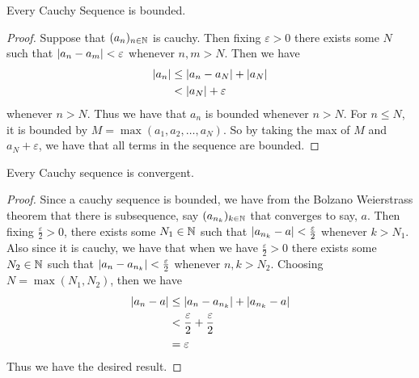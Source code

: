 \documentclass[a4paper]{article}
\begin{document}
\begin{prp}{}{} Every Cauchy Sequence is bounded. \tcbline
\begin{proof} Suppose that $(a_n)_{n\in\mathbb{N}}$ is cauchy. Then fixing $\varepsilon>0$ there exists some $N$ such that $\abs{a_n-a_m}<\varepsilon$ whenever $n,m>N$. Then we have
\begin{align*}
\abs{a_n}&\leq\abs{a_n-a_N}+\abs{a_N}\\
&<\abs{a_N}+\varepsilon
\end{align*}
whenever $n>N$. Thus we have that $a_n$ is bounded whenever $n>N$. For $n\leq N$, it is bounded by $M=\max{(a_1,a_2,\dots,a_N)}$. So by taking the max of $M$ and $a_N+\varepsilon$, we have that all terms in the sequence are bounded. 
\end{proof}
\end{prp}

\begin{prp}{}{} Every Cauchy sequence is convergent. \tcbline
\begin{proof} Since a cauchy sequence is bounded, we have from the Bolzano Weierstrass theorem that there is subsequence, say $(a_{n_k})_{k\in\mathbb{N}}$ that converges to say, $a$. Then fixing $\frac{\varepsilon}{2}>0$, there exists some $N_1\in\mathbb{N}$ such that $\abs{a_{n_k}-a}<\frac{\varepsilon}{2}$ whenever $k>N_1$. Also since it is cauchy, we have that when we have $\frac{\varepsilon}{2}>0$ there exists some $N_2\in\mathbb{N}$ such that $\abs{a_n-a_{n_k}}<\frac{\varepsilon}{2}$ whenever $n,k>N_2$. Choosing $N=\max{(N_1,N_2)}$, then we have 
\begin{align*}
\abs{a_n-a}&\leq\abs{a_n-a_{n_k}}+\abs{a_{n_k}-a} \\
&<\frac{\varepsilon}{2}+\frac{\varepsilon}{2} \\
&=\varepsilon
\end{align*}
Thus we have the desired result. 
\end{proof}
\end{prp}
\end{document}
